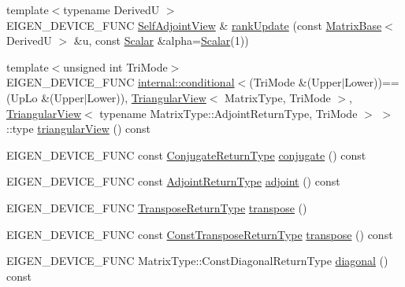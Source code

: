 \begin{DoxyCompactItemize}
\item 
{\footnotesize template$<$typename DerivedU $>$ }\\E\+I\+G\+E\+N\+\_\+\+D\+E\+V\+I\+C\+E\+\_\+\+F\+U\+NC \mbox{\hyperlink{class_eigen_1_1_self_adjoint_view}{Self\+Adjoint\+View}} \& \mbox{\hyperlink{class_eigen_1_1_self_adjoint_view_a069a85ae895ef96f21a2b180cfe84097}{rank\+Update}} (const \mbox{\hyperlink{class_eigen_1_1_matrix_base}{Matrix\+Base}}$<$ DerivedU $>$ \&u, const \mbox{\hyperlink{class_eigen_1_1_self_adjoint_view_af52acc0942ece2de9b6db4a99cc6656e}{Scalar}} \&alpha=\mbox{\hyperlink{class_eigen_1_1_self_adjoint_view_af52acc0942ece2de9b6db4a99cc6656e}{Scalar}}(1))
\item 
{\footnotesize template$<$unsigned int Tri\+Mode$>$ }\\E\+I\+G\+E\+N\+\_\+\+D\+E\+V\+I\+C\+E\+\_\+\+F\+U\+NC \mbox{\hyperlink{struct_eigen_1_1internal_1_1conditional}{internal\+::conditional}}$<$(Tri\+Mode \&(Upper$\vert$Lower))==(Up\+Lo \&(Upper$\vert$Lower)), \mbox{\hyperlink{class_eigen_1_1_triangular_view}{Triangular\+View}}$<$ Matrix\+Type, Tri\+Mode $>$, \mbox{\hyperlink{class_eigen_1_1_triangular_view}{Triangular\+View}}$<$ typename Matrix\+Type\+::\+Adjoint\+Return\+Type, Tri\+Mode $>$ $>$\+::type \mbox{\hyperlink{class_eigen_1_1_self_adjoint_view_ac7b8bf0e2e4636b3d1e4f0564716bf6d}{triangular\+View}} () const
\item 
E\+I\+G\+E\+N\+\_\+\+D\+E\+V\+I\+C\+E\+\_\+\+F\+U\+NC const \mbox{\hyperlink{class_eigen_1_1_self_adjoint_view}{Conjugate\+Return\+Type}} \mbox{\hyperlink{class_eigen_1_1_self_adjoint_view_aee8afbae3643e8af7cdfb5791404fc22}{conjugate}} () const
\item 
E\+I\+G\+E\+N\+\_\+\+D\+E\+V\+I\+C\+E\+\_\+\+F\+U\+NC const \mbox{\hyperlink{class_eigen_1_1_self_adjoint_view}{Adjoint\+Return\+Type}} \mbox{\hyperlink{class_eigen_1_1_self_adjoint_view_a2c19217199aaec1dc208f0e3f437dae6}{adjoint}} () const
\item 
E\+I\+G\+E\+N\+\_\+\+D\+E\+V\+I\+C\+E\+\_\+\+F\+U\+NC \mbox{\hyperlink{class_eigen_1_1_self_adjoint_view}{Transpose\+Return\+Type}} \mbox{\hyperlink{class_eigen_1_1_self_adjoint_view_abdff2b280dd18dfbe1ca99338b381870}{transpose}} ()
\item 
E\+I\+G\+E\+N\+\_\+\+D\+E\+V\+I\+C\+E\+\_\+\+F\+U\+NC const \mbox{\hyperlink{class_eigen_1_1_self_adjoint_view}{Const\+Transpose\+Return\+Type}} \mbox{\hyperlink{class_eigen_1_1_self_adjoint_view_aa1304047233ca6b8c9ee87c025edccc9}{transpose}} () const
\item 
E\+I\+G\+E\+N\+\_\+\+D\+E\+V\+I\+C\+E\+\_\+\+F\+U\+NC Matrix\+Type\+::\+Const\+Diagonal\+Return\+Type \mbox{\hyperlink{class_eigen_1_1_self_adjoint_view_abe2f0e6cbade78463ff973178947db98}{diagonal}} () const

\end{DoxyCompactItemize}
